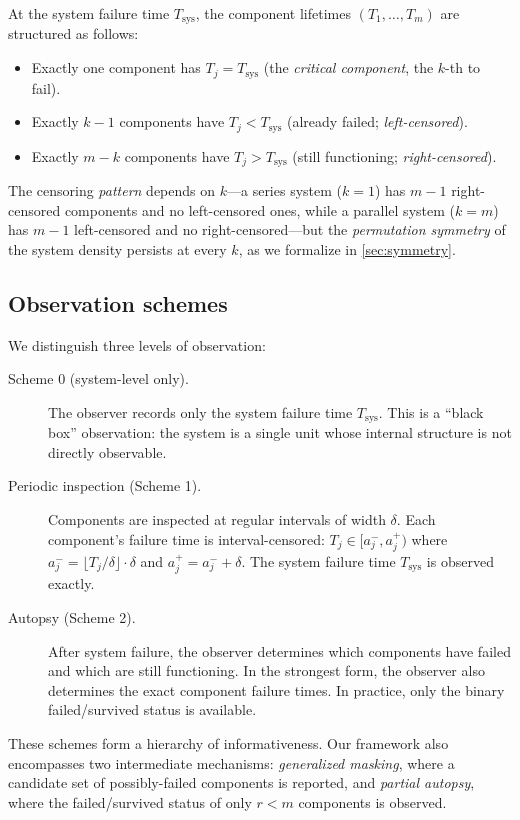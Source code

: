 \documentclass[12pt]{article}
\newcommand{\Tsys}{T_{\mathrm{sys}}}
\begin{document}
At the system failure time $\Tsys$, the component lifetimes $(T_1, \ldots,
T_m)$ are structured as follows:
\begin{itemize}
  \item Exactly one component has $T_j = \Tsys$ (the \emph{critical
    component}, the $k$-th to fail).
  \item Exactly $k - 1$ components have $T_j < \Tsys$ (already failed;
    \emph{left-censored}).
  \item Exactly $m - k$ components have $T_j > \Tsys$ (still functioning;
    \emph{right-censored}).
\end{itemize}
The censoring \emph{pattern} depends on $k$---a series system ($k = 1$) has
$m - 1$ right-censored components and no left-censored ones, while a parallel
system ($k = m$) has $m - 1$ left-censored and no right-censored---but the
\emph{permutation symmetry} of the system density persists at every $k$, as
we formalize in \cref{sec:symmetry}.

\subsection{Observation schemes}\label{sec:obs-schemes}

We distinguish three levels of observation:
\begin{description}
  \item[Scheme 0 (system-level only).]
    The observer records only the system failure time $\Tsys$.
    This is a ``black box'' observation: the system is a single unit whose
    internal structure is not directly observable.
  \item[Periodic inspection (Scheme 1).]
    Components are inspected at regular intervals of width $\delta$.
    Each component's failure time is interval-censored:
    $T_j \in [a_j^{-}, a_j^{+})$ where $a_j^{-} = \lfloor T_j / \delta
    \rfloor \cdot \delta$ and $a_j^{+} = a_j^{-} + \delta$.
    The system failure time $\Tsys$ is observed exactly.
  \item[Autopsy (Scheme 2).]
    After system failure, the observer determines which components have
    failed and which are still functioning.  In the strongest form, the
    observer also determines the exact component failure times.  In
    practice, only the binary failed/survived status is available.
\end{description}

These schemes form a hierarchy of informativeness.  Our framework also
encompasses two intermediate mechanisms: \emph{generalized masking}, where a
candidate set of possibly-failed components is reported, and \emph{partial
autopsy}, where the failed/survived status of only $r < m$ components is
observed.
\end{document}
